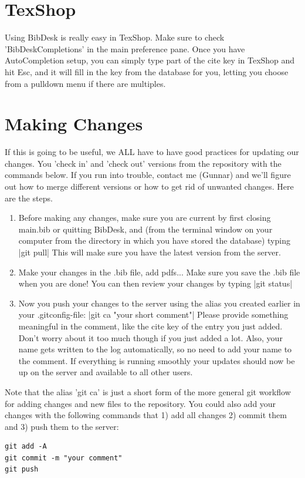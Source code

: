 \documentclass[11pt, oneside]{article}   	%
\begin{document}
\section{TexShop}

Using BibDesk is really easy in TexShop. Make sure to check 'BibDeskCompletions' in the main preference pane. Once you have AutoCompletion setup, you can simply type part of the cite key in TexShop and hit Esc, and it will fill in the key from the database for you, letting you choose from a pulldown menu if there are multiples.

\section{Making Changes}

If this is going to be useful, we ALL have to have good practices for updating our changes. You 'check in' and 'check out' versions from the repository with the commands below. If you run into trouble, contact me (Gunnar) and we'll figure out how to merge different versions or how to get rid of unwanted changes.  
	Here are the steps. 
	
\begin{enumerate}
\item Before making any changes, make sure you are current by first closing main.bib or quitting BibDesk, and (from the terminal window on your computer from the directory in which you have stored the database) typing
|git pull|
This will make sure you have the latest version from the server.

\item Make your changes in the .bib file, add pdfs... Make sure you save the .bib file when you are done! You can then review your changes by typing
|git status|

\item Now you push your changes to the server using the alias you created earlier in your .gitconfig-file:
|git ca "your short comment"|
Please provide something meaningful in the comment, like the cite key of the entry you just added. Don't worry about it too much though if you just added a lot. Also, your name gets written to the log automatically, so no need to add your name to the comment. If everything is running smoothly your updates should now be up on the server and available to all other users.

\end{enumerate}

Note that the alias 'git ca' is just a short form of the more general git workflow for adding changes and new files to the repository. You could also add your changes with the following commands that 1) add all changes 2) commit them and 3) push them to the server:
\begin{verbatim}
git add -A
git commit -m "your comment"
git push
\end{verbatim}
\end{document}
